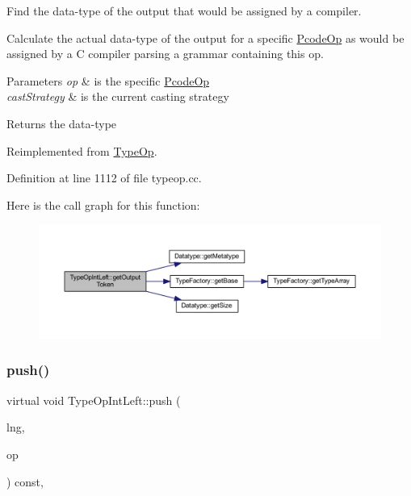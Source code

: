 Find the data-\/type of the output that would be assigned by a compiler. 

Calculate the actual data-\/type of the output for a specific \mbox{\hyperlink{class_pcode_op}{Pcode\+Op}} as would be assigned by a C compiler parsing a grammar containing this op. 
\begin{DoxyParams}{Parameters}
{\em op} & is the specific \mbox{\hyperlink{class_pcode_op}{Pcode\+Op}} \\
\hline
{\em cast\+Strategy} & is the current casting strategy \\
\hline
\end{DoxyParams}
\begin{DoxyReturn}{Returns}
the data-\/type 
\end{DoxyReturn}


Reimplemented from \mbox{\hyperlink{class_type_op_a7150ac93bb03a993735c829deb5237e7}{Type\+Op}}.



Definition at line 1112 of file typeop.\+cc.

Here is the call graph for this function\+:
\nopagebreak
\begin{figure}[H]
\begin{center}
\leavevmode
\includegraphics[width=350pt]{class_type_op_int_left_a0c99823cd347ae28c3608a3f02fdda09_cgraph}
\end{center}
\end{figure}
\mbox{\label{class_type_op_int_left_a4451bade27542ad853dbb21bb26f1191}} 
\subsubsection{\texorpdfstring{push()}{push()}}
{\footnotesize\ttfamily virtual void Type\+Op\+Int\+Left\+::push (\begin{DoxyParamCaption}\item[{\mbox{\hyperlink{class_print_language}{Print\+Language}} $\ast$}]{lng,  }\item[{const \mbox{\hyperlink{class_pcode_op}{Pcode\+Op}} $\ast$}]{op }\end{DoxyParamCaption}) const\hspace{0.3cm}{\ttfamily [inline]}, {\ttfamily [virtual]}}




